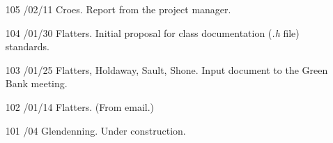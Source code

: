 \begin{enumerate}
\item[105]
/02/11 Croes.
\linebreak  Report from the project manager.

\item[104]
/01/30 Flatters.
\linebreak  Initial proposal for class documentation (\textsl{.h} file) standards.

\item[103]
/01/25 Flatters, Holdaway, Sault, Shone.
\linebreak  Input document to the Green Bank meeting.

\item[102]
/01/14 Flatters.
\linebreak  (From email.)

\item[101]
/04    Glendenning.
\linebreak  Under construction.

\end{enumerate}
